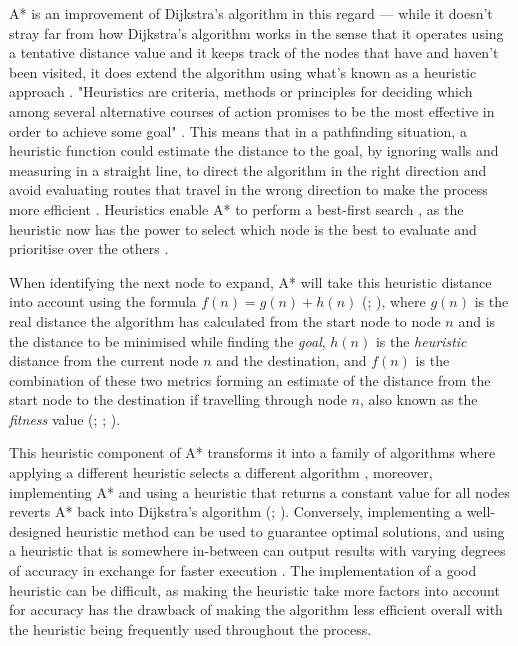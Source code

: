 \documentclass[11pt, a4paper]{article}
\begin{document}
A* is an improvement of Dijkstra's algorithm in this regard \parencite[101]{hart1968formal} --- while it doesn't stray far from how Dijkstra's algorithm works in the sense that it operates using a tentative distance value and it keeps track of the nodes that have and haven't been visited, it does extend the algorithm using what's known as a heuristic approach \parencite[126]{cui2011based}. "Heuristics are criteria, methods or principles for deciding which among several alternative courses of action promises to be the most effective in order to achieve some goal" \parencite[3]{pearl1984heuristics}. This means that in a pathfinding situation, a heuristic function could estimate the distance to the goal, by ignoring walls and measuring in a straight line, to direct the algorithm in the right direction and avoid evaluating routes that travel in the wrong direction to make the process more efficient \parencite[127]{cui2011based}. Heuristics enable A* to perform a best-first search \parencite[46]{yap2002grid}, as the heuristic now has the power to select which node is the best to evaluate and prioritise over the others \parencite[94]{russell2016artificial}.

When identifying the next node to expand, A* will take this heuristic distance into account using the formula $f(n) = g(n) + h(n)$ (\cite[102]{hart1968formal}; \cite[95]{russell2016artificial}), where $g(n)$ is the real distance the algorithm has calculated from the start node to node $n$ and is the distance to be minimised while finding the \emph{goal}, $h(n)$ is the \emph{heuristic} distance from the current node $n$ and the destination, and $f(n)$ is the combination of these two metrics forming an estimate of the distance from the start node to the destination if travelling through node $n$, also known as the \emph{fitness} value (\cite{hart1968formal}; \cite{millington2019ai}; \cite[64]{graham2003pathfinding}). 

This heuristic component of A* transforms it into a family of algorithms where applying a different heuristic selects a different algorithm \parencite[107]{hart1968formal}, moreover, implementing A* and using a heuristic that returns a constant value for all nodes reverts A* back into Dijkstra's algorithm (\cite[10]{lester2005pathfinding}; \cite[237]{millington2019ai}). Conversely, implementing a well-designed heuristic method can be used to guarantee optimal solutions, and using a heuristic that is somewhere in-between can output results with varying degrees of accuracy in exchange for faster execution \parencite[219]{millington2019ai}.  The implementation of a good heuristic can be difficult, as making the heuristic take more factors into account for accuracy has the drawback of making the algorithm less efficient overall with the heuristic being frequently used throughout the process.
\end{document}
